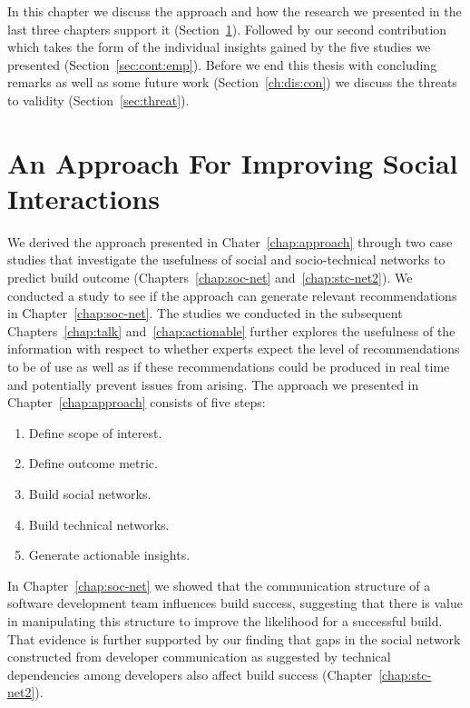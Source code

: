 \label{chap:disc}
In this chapter we discuss the approach and how the research we presented in the last three chapters support it (Section~\ref{ch:dis:app}).
Followed by our second contribution which takes the form of the individual insights gained by the five studies we presented (Section~\ref{sec:cont:emp}).
Before we end this thesis with concluding remarks as well as some future work (Section~\ref{ch:dis:con}) we discuss the threats to validity (Section~\ref{sec:threat}).

\section{An Approach For Improving Social Interactions}
\label{ch:dis:app}
We derived the approach presented in Chater~\ref{chap:approach} through two case studies that investigate the usefulness of social and socio-technical networks to predict build outcome (Chapters~\ref{chap:soc-net} and~\ref{chap:stc-net2}).
We conducted a study to see if the approach can generate relevant recommendations in Chapter~\ref{chap:soc-net}.
The studies we conducted in the subsequent Chapters~\ref{chap:talk} and~\ref{chap:actionable} further explores the usefulness of the information with respect to whether experts expect the level of recommendations to be of use as well as if these recommendations could be produced in real time and potentially prevent issues from arising.
The approach we presented in Chapter~\ref{chap:approach} consists of five steps:

\begin{enumerate}
\item Define scope of interest.
\item Define outcome metric.
\item Build social networks.
\item Build technical networks.
\item Generate actionable insights.
\end{enumerate}

In Chapter~\ref{chap:soc-net} we showed that the communication structure of a software development team influences build success, suggesting that there is value in manipulating this structure to improve the likelihood for a successful build.
That evidence is further supported by our finding that gaps in the social network constructed from developer communication as suggested by technical dependencies among developers also affect build success (Chapter~\ref{chap:stc-net2}).

